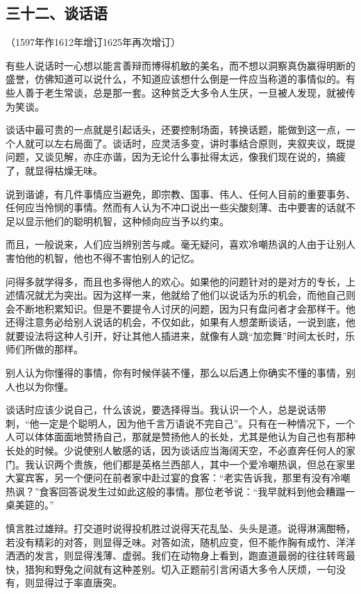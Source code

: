 \subsection*{三十二、谈话语}
\begin{center}
    （1597年作1612年增订1625年再次增订）
\end{center}
\par 有些人说话时一心想以能言善辩而博得机敏的美名，而不想以洞察真伪赢得明断的盛誉，仿佛知道可以说什么，不知道应该想什么倒是一件应当称道的事情似的。有些人善于老生常谈，总是那一套。这种贫乏大多令人生厌，一旦被人发现，就被传为笑谈。
\par 谈话中最可贵的一点就是引起话头，还要控制场面，转换话题，能做到这一点，一个人就可以左右局面了。谈话时，应灵活多变，讲时事结合原则，夹叙夹议，既提问题，又谈见解，亦庄亦谐，因为无论什么事扯得太远，像我们现在说的，搞疲了，就显得枯燥无味。
\par 说到谐谑，有几件事情应当避免，即宗教、国事、伟人、任何人目前的重要事务、任何应当怜悯的事情。然而有人认为不冲口说出一些尖酸刻薄、击中要害的话就不足以显示他们的聪明机智，这种倾向应当予以约束。
\par 而且，一般说来，人们应当辨别苦与咸。毫无疑问，喜欢冷嘲热讽的人由于让别人害怕他的机智，他也不得不害怕别人的记忆。
\par 问得多就学得多，而且也多得他人的欢心。如果他的问题针对的是对方的专长，上述情况就尤为突出。因为这样一来，他就给了他们以说话为乐的机会，而他自己则会不断地积累知识。但是不要提令人讨厌的问题，因为只有盘问者才会那样干。他还得注意务必给别人说话的机会，不仅如此，如果有人想垄断谈话，一说到底，他就要设法将这种人引开，好让其他人插进来，就像有人跳“加恋舞”时间太长时，乐师们所做的那样。
\par 别人认为你懂得的事情，你有时候佯装不懂，那么以后遇上你确实不懂的事情，别人也以为你懂。
\par 谈话时应该少说自己，什么该说，要选择得当。我认识一个人，总是说话带刺，“他一定是个聪明人，因为他千言万语说不完自己”。只有在一种情况下，一个人可以体体面面地赞扬自己，那就是赞扬他人的长处，尤其是他认为自己也有那种长处的时候。少说使别人敏感的话，因为谈话应当海阔天空，不必直奔任何人的家门。我认识两个贵族，他们都是英格兰西部人，其中一个爱冷嘲热讽，但总在家里大宴宾客，另一个便问在前者家中赴过宴的食客：“老实告诉我，那里有没有冷嘲热讽？”食客回答说发生过如此这般的事情。那位老爷说：“我早就料到他会糟蹋一桌美筵的。”
\par 慎言胜过雄辩。打交道时说得投机胜过说得天花乱坠、头头是道。说得淋漓酣畅，若没有精彩的对答，则显得乏味。对答如流，随机应变，但不能作胸有成竹、洋洋洒洒的发言，则显得浅薄、虚弱。我们在动物身上看到，跑直道最弱的往往转弯最快，猎狗和野兔之间就有这种差别。切入正题前引言闲语大多令人厌烦，一句没有，则显得过于率直唐突。




